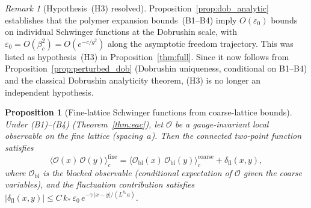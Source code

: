 \documentclass[11pt,a4paper]{article}
\theoremstyle{plain}
\newtheorem{proposition}[theorem]{Proposition}
\theoremstyle{definition}
\theoremstyle{remark}
\newtheorem{remark}[theorem]{Remark}
\begin{document}
\begin{remark}[Hypothesis~(H3) resolved]
\label{rem:h3}
Proposition~\ref{prop:dob_analytic} establishes that
the polymer expansion bounds~(B1--B4) imply
$O(\varepsilon_0)$ bounds on individual Schwinger
functions at the Dobrushin scale, with
$\varepsilon_0 = O(\beta_c^2) = O(e^{-c/g^2})$
along the asymptotic freedom trajectory.
This was listed as hypothesis~(H3) in
Proposition~\ref{thm:full}.
Since it now follows from
Proposition~\ref{prop:perturbed_dob}
(Dobrushin uniqueness, conditional on B1--B4)
and the classical Dobrushin analyticity theorem,
(H3) is no longer an independent hypothesis.
\end{remark}

\begin{proposition}[Fine-lattice Schwinger functions from
coarse-lattice bounds]\label{prop:fine_coarse}
Under (B1)--(B4) (Theorem~\ref{thm:eac}), let
$\mathcal{O}$ be a gauge-invariant local observable
on the fine lattice (spacing~$a$).  Then the
connected two-point function satisfies
\begin{equation}\label{eq:fine_coarse}
  \langle \mathcal{O}(x)\,\mathcal{O}(y)\rangle_c^{\text{fine}}
  = \langle \mathcal{O}_{\mathrm{bl}}(x)\,
  \mathcal{O}_{\mathrm{bl}}(y)
  \rangle_c^{\text{coarse}}
  + \delta_{\mathrm{fl}}(x,y),
\end{equation}
where $\mathcal{O}_{\mathrm{bl}}$ is the blocked
observable \textup{(}conditional expectation of
$\mathcal{O}$ given the coarse variables\textup{)},
and the fluctuation contribution satisfies
$|\delta_{\mathrm{fl}}(x,y)| \leq C\,k_*\,\varepsilon_0
\,e^{-\gamma\,|x-y|/(L^{k_*}a)}$.
\end{proposition}
\end{document}
